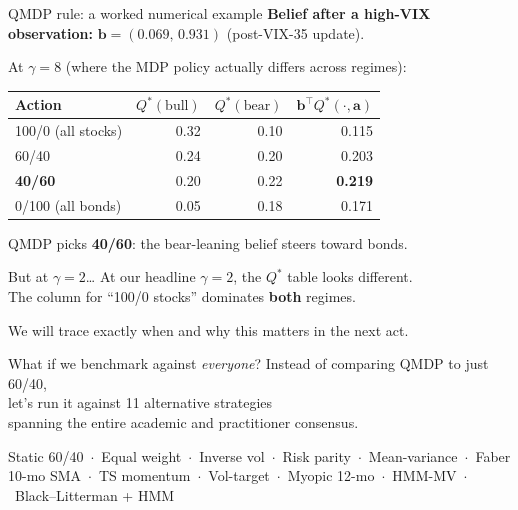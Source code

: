 \documentclass[11pt,aspectratio=169]{beamer}
\newcommand{\bel}{\mathbf{b}}
\begin{document}
\begin{frame}{QMDP rule: a worked numerical example}
\textbf{Belief after a high-VIX observation:} $\mathbf{b}=(0.069,\,0.931)$ (post-VIX-35 update).

\smallskip
At $\gamma{=}8$ (where the MDP policy actually differs across regimes):

\centering\small\renewcommand{\arraystretch}{1.15}
\begin{tabular}{l rr r}
\toprule
\textbf{Action} & \textbf{$Q^\ast(\text{bull})$} & \textbf{$Q^\ast(\text{bear})$} & \textbf{$\bel^\top Q^\ast(\cdot,\mathbf{a})$} \\
\midrule
100/0 (all stocks) & 0.32 & 0.10 & 0.115 \\
60/40              & 0.24 & 0.20 & 0.203 \\
\rowcolor{cg!20}\textbf{40/60} & 0.20 & 0.22 & \textbf{0.219} \\
0/100 (all bonds)  & 0.05 & 0.18 & 0.171 \\
\bottomrule
\end{tabular}

\medskip
\centering
QMDP picks \textbf{40/60}: the bear-leaning belief steers toward bonds.
\end{frame}

\begin{frame}{But at $\gamma{=}2$\ldots}
\bigskip
\centering
\large
At our headline $\gamma{=}2$, the $Q^\ast$ table looks different.\\
The column for ``100/0 stocks'' dominates \textbf{both} regimes.

\bigskip
{}

\bigskip
\small We will trace exactly when and why this matters in the next act.
\end{frame}


\begin{frame}{What if we benchmark against \emph{everyone}?}
\bigskip
\centering
\Large Instead of comparing QMDP to just 60/40,\\
let's run it against \alert{11 alternative strategies}\\
spanning the entire academic and practitioner consensus.

\bigskip\bigskip
\small
Static 60/40\ $\cdot$\ Equal weight\ $\cdot$\ Inverse vol\ $\cdot$\ Risk parity\ $\cdot$\ Mean-variance\ $\cdot$\ Faber 10-mo SMA\ $\cdot$\ TS momentum\ $\cdot$\ Vol-target\ $\cdot$\ Myopic 12-mo\ $\cdot$\ HMM-MV\ $\cdot$\ Black--Litterman + HMM
\end{frame}
\end{document}
